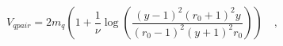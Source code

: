 \begin{equation}
V_{qpair} = 2 m_q\left(1+
\frac{1}{\nu}\log\left(\frac{(y-1)^2(r_0+1)^2y}{(r_0-1)^2(y+1)^2r_0}\right)\right)\quad,
\end{equation}

